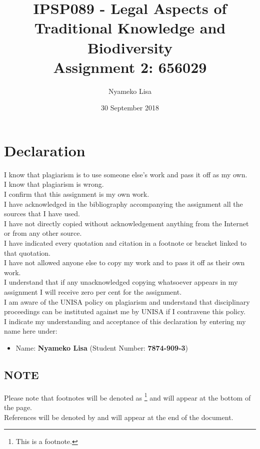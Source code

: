 \documentclass[11pt]{article}
\author{Nyameko Lisa}
\date{30 September 2018}
\title{IPSP089 - Legal Aspects of Traditional Knowledge and Biodiversity\\\medskip
\large Assignment 2: 656029}
\begin{document}
\maketitle
\addvspace{110pt}

\justifying
\addvspace{110pt}
\section*{Declaration}
\label{sec:orgbd182c5}
I know that plagiarism is to use someone else’s work and pass it off as my own.\\
I know that plagiarism is wrong.\\
I confirm that this assignment is my own work.\\
I have acknowledged in the bibliography accompanying the assignment all the sources that I have used.\\
I have not directly copied without acknowledgement anything from the Internet or from any other source.\\
I have indicated every quotation and citation in a footnote or bracket linked to that quotation.\\
I have not allowed anyone else to copy my work and to pass it off as their own work.\\
I understand that if any unacknowledged copying whatsoever appears in my assignment I will receive zero per cent for the assignment.\\
I am aware of the UNISA policy on plagiarism and understand that disciplinary proceedings can be instituted against me by UNISA if I contravene this policy.\\
I indicate my understanding and acceptance of this declaration by
entering my name here under:
\begin{itemize}
\item Name: \textbf{Nyameko Lisa} (Student Number: \textbf{7874-909-3})
\end{itemize}

\subsection*{NOTE}
\label{sec:org1f0d708}
Please note that footnotes will be denoted as \footnote{This is a footnote.} and will
appear at the bottom of the page.\\
References will be denoted by \cite{rsa93_tm_act} and will appear at the end of the document.
\newpage
\end{document}
